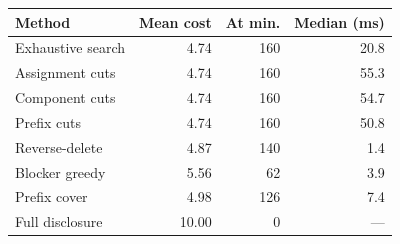 \begin{center}
\begin{tabular}{@{}lrrr@{}}
\toprule
Method & Mean cost & At min. & Median (ms)\\
\midrule
Exhaustive search & 4.74 & 160 & 20.8\\
Assignment cuts & 4.74 & 160 & 55.3\\
Component cuts & 4.74 & 160 & 54.7\\
Prefix cuts & 4.74 & 160 & 50.8\\
Reverse-delete & 4.87 & 140 & 1.4\\
Blocker greedy & 5.56 & 62 & 3.9\\
Prefix cover & 4.98 & 126 & 7.4\\
Full disclosure & 10.00 & 0 & ---\\
\bottomrule
\end{tabular}
\end{center}

